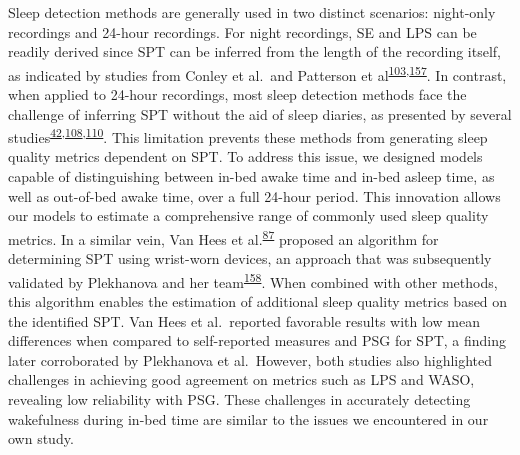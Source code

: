 \documentclass[
  10pt,
]{scrbook}
\begin{document}
Sleep detection methods are generally used in two distinct scenarios:
night-only recordings and 24-hour recordings. For night recordings, SE
and LPS can be readily derived since SPT can be inferred from the length
of the recording itself, as indicated by studies from Conley et al.~and
Patterson et
al\textsuperscript{\protect\hyperlink{ref-conley_agreement_2019}{103},\protect\hyperlink{ref-patterson_40_2023}{157}}.
In contrast, when applied to 24-hour recordings, most sleep detection
methods face the challenge of inferring SPT without the aid of sleep
diaries, as presented by several
studies\textsuperscript{\protect\hyperlink{ref-girschik_validation_2012}{42},\protect\hyperlink{ref-doherty_large_2017}{108},\protect\hyperlink{ref-anderson_assessment_2014}{110}}.
This limitation prevents these methods from generating sleep quality
metrics dependent on SPT. To address this issue, we designed models
capable of distinguishing between in-bed awake time and in-bed asleep
time, as well as out-of-bed awake time, over a full 24-hour period. This
innovation allows our models to estimate a comprehensive range of
commonly used sleep quality metrics. In a similar vein, Van Hees et
al.\textsuperscript{\protect\hyperlink{ref-van_hees_estimating_2018}{87}}
proposed an algorithm for determining SPT using wrist-worn devices, an
approach that was subsequently validated by Plekhanova and her
team\textsuperscript{\protect\hyperlink{ref-plekhanova_validation_2023}{158}}.
When combined with other methods, this algorithm enables the estimation
of additional sleep quality metrics based on the identified SPT. Van
Hees et al.~reported favorable results with low mean differences when
compared to self-reported measures and PSG for SPT, a finding later
corroborated by Plekhanova et al.~However, both studies also highlighted
challenges in achieving good agreement on metrics such as LPS and WASO,
revealing low reliability with PSG. These challenges in accurately
detecting wakefulness during in-bed time are similar to the issues we
encountered in our own study.
\end{document}
